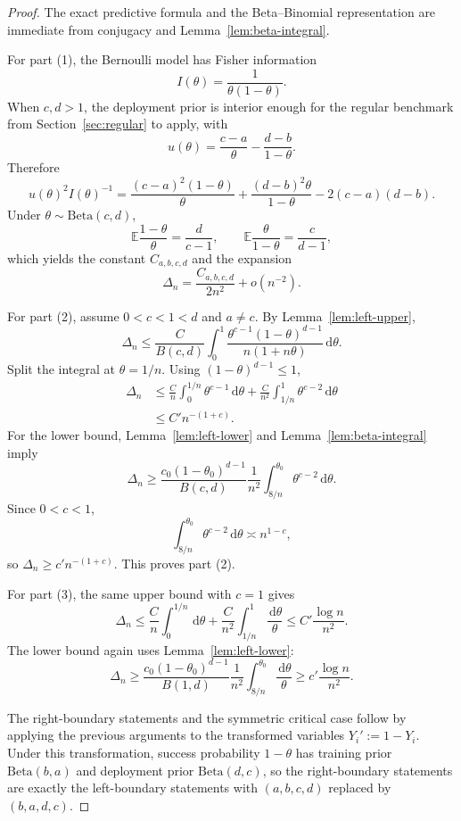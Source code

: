 \documentclass{article}
\theoremstyle{definition}
\theoremstyle{remark}
\newcommand{\E}{\mathbb{E}}
\newcommand{\BetaDist}{\mathrm{Beta}}
\newcommand{\dd}{\,\mathrm{d}}
\begin{document}
\begin{proof}
The exact predictive formula and the Beta--Binomial representation are immediate from conjugacy and Lemma~\ref{lem:beta-integral}.

For part (1), the Bernoulli model has Fisher information
\[
I(\theta)=\frac{1}{\theta(1-\theta)}.
\]
When $c,d>1$, the deployment prior is interior enough for the regular benchmark from Section~\ref{sec:regular} to apply, with
\[
u(\theta)
=
\frac{c-a}{\theta}
- \frac{d-b}{1-\theta}.
\]
Therefore
\[
u(\theta)^2 I(\theta)^{-1}
=
\frac{(c-a)^2(1-\theta)}{\theta}
+
\frac{(d-b)^2\theta}{1-\theta}
-2(c-a)(d-b).
\]
Under $\theta\sim\BetaDist(c,d)$,
\[
\E\frac{1-\theta}{\theta}=\frac{d}{c-1},
\qquad
\E\frac{\theta}{1-\theta}=\frac{c}{d-1},
\]
which yields the constant $C_{a,b,c,d}$ and the expansion
\[
\Delta_n = \frac{C_{a,b,c,d}}{2n^2}+o(n^{-2}).
\]

For part (2), assume $0<c<1<d$ and $a\neq c$. By Lemma~\ref{lem:left-upper},
\[
\Delta_n
\le
\frac{C}{B(c,d)}
\int_0^1
\frac{\theta^{c-1}(1-\theta)^{d-1}}{n(1+n\theta)}
\dd\theta.
\]
Split the integral at $\theta=1/n$. Using $(1-\theta)^{d-1}\le 1$,
\begin{align*}
\Delta_n
&\le
\frac{C}{n}\int_0^{1/n}\theta^{c-1}\dd\theta
+
\frac{C}{n^2}\int_{1/n}^{1}\theta^{c-2}\dd\theta \\
&\le
C' n^{-(1+c)}.
\end{align*}
For the lower bound, Lemma~\ref{lem:left-lower} and Lemma~\ref{lem:beta-integral} imply
\[
\Delta_n
\ge
\frac{c_0(1-\theta_0)^{d-1}}{B(c,d)}
\frac{1}{n^2}
\int_{8/n}^{\theta_0}\theta^{c-2}\dd\theta.
\]
Since $0<c<1$,
\[
\int_{8/n}^{\theta_0}\theta^{c-2}\dd\theta
\asymp n^{1-c},
\]
so $\Delta_n\ge c' n^{-(1+c)}$. This proves part (2).

For part (3), the same upper bound with $c=1$ gives
\[
\Delta_n
\le
\frac{C}{n}\int_0^{1/n}\dd\theta
+
\frac{C}{n^2}\int_{1/n}^{1}\frac{\dd\theta}{\theta}
\le
C' \frac{\log n}{n^2}.
\]
The lower bound again uses Lemma~\ref{lem:left-lower}:
\[
\Delta_n
\ge
\frac{c_0(1-\theta_0)^{d-1}}{B(1,d)}
\frac{1}{n^2}
\int_{8/n}^{\theta_0}\frac{\dd\theta}{\theta}
\ge
c' \frac{\log n}{n^2}.
\]

The right-boundary statements and the symmetric critical case follow by applying the previous arguments to the transformed variables $Y_i' := 1-Y_i$. Under this transformation, success probability $1-\theta$ has training prior $\BetaDist(b,a)$ and deployment prior $\BetaDist(d,c)$, so the right-boundary statements are exactly the left-boundary statements with $(a,b,c,d)$ replaced by $(b,a,d,c)$.
\end{proof}
\end{document}
